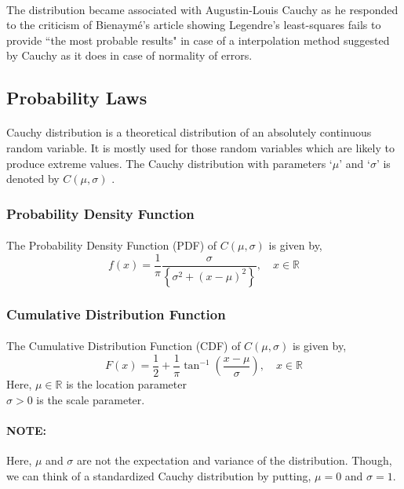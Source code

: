 \documentclass[12pt, fleqn, a4paper]{article}
\newcommand{\chy}{\(\mathit{C}(\mu, \sigma)\) }
\begin{document}
	\paragraph{} The distribution became associated with Augustin-Louis Cauchy as he responded to the criticism of Bienaym\'e's article showing Legendre's least-squares fails to provide ``the most probable results" in case of a interpolation method suggested by Cauchy as it does in case of normality of errors.
	
	\subsection{Probability Laws}
	\paragraph{} Cauchy distribution is a theoretical distribution of an absolutely continuous random variable. It is mostly used for those random variables which are likely to produce extreme values. The Cauchy distribution with parameters `\(\mu\)' and `\(\sigma\)' is denoted by \chy.
	
	\subsubsection{Probability Density Function}
	\paragraph{} The Probability Density Function (PDF) of \chy is given by, $$f(x)=\frac{1}{\pi}\frac{\sigma} {\left\{\sigma^2+(x-\mu)^2\right\}},\quad x\in\mathbb{R}$$
	
	\subsubsection{Cumulative Distribution Function}
	\paragraph{} The Cumulative Distribution Function (CDF) of \chy is given by, $$F(x)=\frac{1}{2}+\frac{1}{\pi}\tan^{-1}\left(\frac{x-\mu}{\sigma}\right),\quad x\in\mathbb{R}$$ Here, \(\mu\in\mathbb R\) is the location parameter\\ \(\sigma>0\) is the scale parameter.
	\paragraph{NOTE:} Here, \(\mu\) and \(\sigma\) are not the expectation and variance of the distribution. Though, we can think of a standardized Cauchy distribution by putting, \(\mu=0\) and \(\sigma=1\).
	
\end{document}
